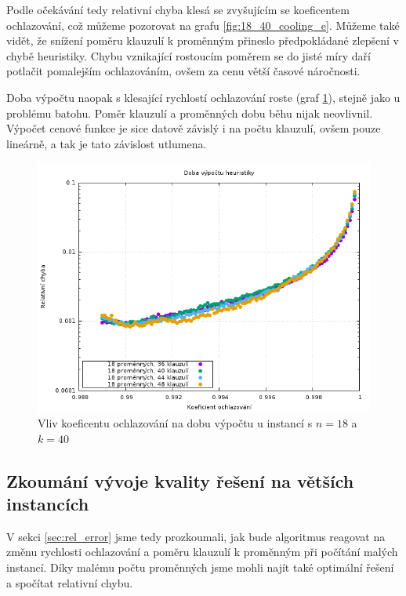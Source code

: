 \documentclass[11pt]{article}
\begin{document}
Podle očekávání tedy relativní chyba klesá se zvyšujícím se koeficentem ochlazování, což můžeme pozorovat na grafu \ref{fig:18_40_cooling_e}. Můžeme také vidět, že snížení poměru klauzulí k proměnným přineslo předpokládané zlepšení  v chybě heuristiky. Chybu vznikající rostoucím poměrem se do jisté míry daří potlačit pomalejším ochlazováním, ovšem za cenu větší časové náročnosti.

Doba výpočtu naopak s klesající rychlostí ochlazování roste (graf \ref{fig:18_40_cooling_t}), stejně jako u problému batohu. Poměr klauzulí a proměnných dobu běhu nijak neovlivnil. Výpočet cenové funkce je sice datově závislý i na počtu klauzulí, ovšem pouze lineárně, a tak je tato závislost utlumena. 

\begin{figure}[h!]
	\centering
	\includegraphics[width=\textwidth]{../grafy/18_40_cooling_t.png}
	\caption{Vliv koeficentu ochlazování na dobu výpočtu u instancí s $n=18$ a $k=40$}
	\label{fig:18_40_cooling_t}
\end{figure}

\subsection{Zkoumání vývoje kvality řešení na větších instancích}

V sekci \ref{sec:rel_error} jsme tedy prozkoumali, jak bude algoritmus reagovat na změnu rychlosti ochlazování a poměru klauzulí k proměnným při počítání malých instancí. Díky malému počtu proměnných jsme mohli najít také optimální řešení a spočítat relativní chybu.
\end{document}

